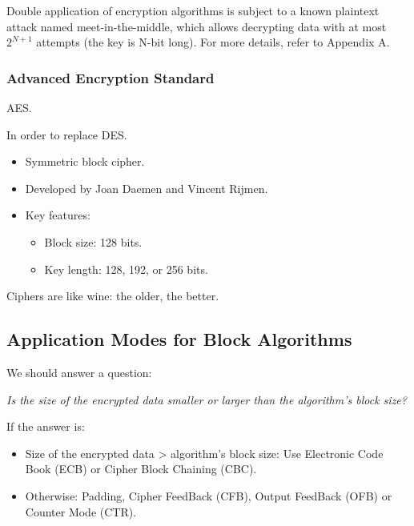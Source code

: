 \begin{tcolorbox}[colback=blue!10!white, colframe=blue!50!white, title=Meet-in-the-Middle attack]
    Double application of encryption algorithms is subject to a known plaintext attack named meet-in-the-middle, which allows decrypting data with at most $2^{N+1}$ attempts (the key is N-bit long).
    For more details, refer to Appendix A.
\end{tcolorbox}

\subsubsection{Advanced Encryption Standard}
\begin{center}
    AES.
\end{center}
In order to replace DES.

\begin{itemize}
    \item Symmetric block cipher.
    \item Developed by Joan Daemen and Vincent Rijmen.
    \item Key features:
    \begin{itemize}
        \item Block size: 128 bits.
        \item Key length: 128, 192, or 256 bits.
    \end{itemize}
\end{itemize}

\begin{tcolorbox}[colback=blue!10!white, colframe=blue!50!white]
Ciphers are like wine: the older, the better.
\end{tcolorbox}


\subsection{Application Modes for Block Algorithms}
We should answer a question:
\begin{tcolorbox}[colframe=lightblue]
    \begin{center}
        \textit{Is the size of the encrypted data smaller or larger than \newline the algorithm’s block size?}
    \end{center}
\end{tcolorbox}
    

If the answer is:
\begin{itemize}
    \item Size of the encrypted data > algorithm's block size: Use Electronic Code Book (ECB) or Cipher Block Chaining (CBC).
    \item Otherwise: Padding, Cipher FeedBack (CFB), Output FeedBack (OFB) or Counter Mode (CTR).
\end{itemize}

